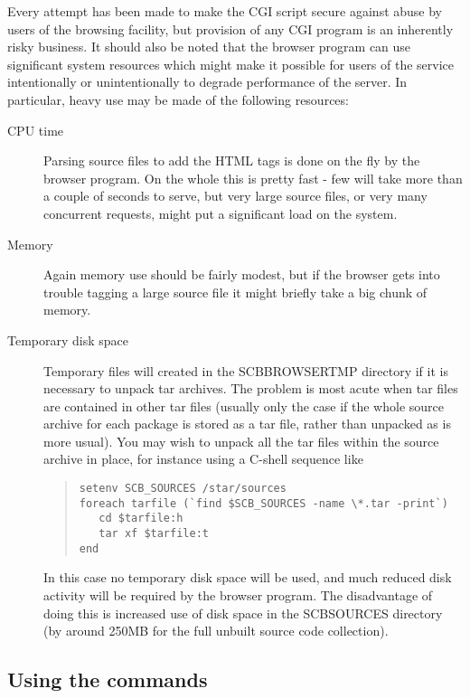 \documentclass[twoside,11pt]{article}
\newcommand{\xlabel}[1]{}
\renewcommand{\_}{\texttt{\symbol{95}}}
\begin{document}
Every attempt has been made to make the CGI script secure against
abuse by users of the browsing facility,
but provision of any CGI program is an inherently risky business.
It should also be noted that the browser 
program can use significant system resources which might 
make it possible for users of the service intentionally or 
unintentionally to degrade performance of the server.
In particular, heavy use may be made of the following resources:
\begin{description}
\item[CPU time] 
Parsing source files to add the HTML tags is done on the fly by 
the browser program.
On the whole this is pretty fast - few will take more than a couple of
seconds to serve, but very large source files, or very many concurrent
requests, might put a significant load on the system.
\item[Memory]
Again memory use should be fairly modest, but if the browser gets into
trouble tagging a large source file it might briefly take a big
chunk of memory.
\item[Temporary disk space]
Temporary files will created in the SCB\_BROWSER\_TMP directory
if it is necessary to unpack tar archives.  The problem is most acute
when tar files are contained in other tar files (usually only the
case if the whole source archive for each package is stored as a tar file,
rather than unpacked as is more usual).  
You may wish to 
unpack all the tar files within the source archive in place,
for instance using a C-shell sequence like 
\begin{quote}
\begin{verbatim}
setenv SCB_SOURCES /star/sources
foreach tarfile (`find $SCB_SOURCES -name \*.tar -print`)
   cd $tarfile:h
   tar xf $tarfile:t
end
\end{verbatim}
\end{quote}
In this case no temporary disk space will be used, and much reduced disk
activity will be required by the browser program.
The disadvantage of doing this is increased use of disk space
in the SCB\_SOURCES directory 
(by around 250MB for the full unbuilt source code collection). 
\end{description}


\subsection{\xlabel{sec:startup}\label{sec:startup}Using the commands}
\end{document}
